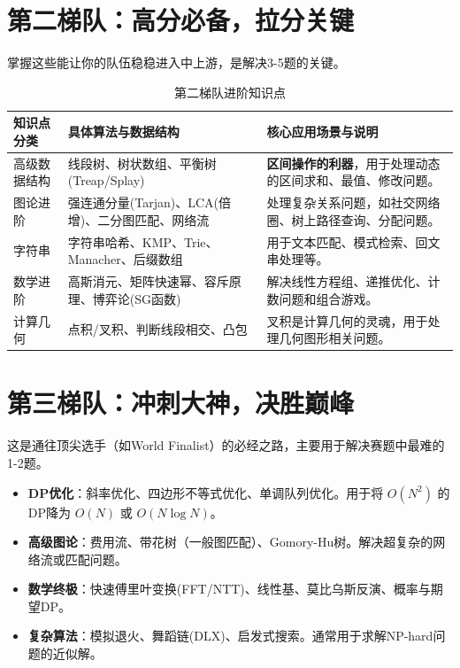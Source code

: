 \documentclass[12pt,a4paper]{ctexart}
\begin{document}
	\section{第二梯队：高分必备，拉分关键}
	掌握这些能让你的队伍稳稳进入中上游，是解决3-5题的关键。
	
	\begin{table}[h!]
		\centering
		\caption{第二梯队进阶知识点}
		\label{tab:tier2}
		\begin{tabularx}{\textwidth}{|X|X|X|}
			\hline
			\rowcolor{lightgray} \textbf{知识点分类} & \textbf{具体算法与数据结构} & \textbf{核心应用场景与说明} \\ \hline
			高级数据结构 & 线段树、树状数组、平衡树(Treap/Splay) & \textbf{区间操作的利器}，用于处理动态的区间求和、最值、修改问题。 \\ \hline
			图论进阶 & 强连通分量(Tarjan)、LCA(倍增)、二分图匹配、网络流 & 处理复杂关系问题，如社交网络圈、树上路径查询、分配问题。 \\ \hline
			字符串 & 字符串哈希、KMP、Trie、Manacher、后缀数组 & 用于文本匹配、模式检索、回文串处理等。 \\ \hline
			数学进阶 & 高斯消元、矩阵快速幂、容斥原理、博弈论(SG函数) & 解决线性方程组、递推优化、计数问题和组合游戏。 \\ \hline
			计算几何 & 点积/叉积、判断线段相交、凸包 & 叉积是计算几何的灵魂，用于处理几何图形相关问题。 \\ \hline
		\end{tabularx}
	\end{table}
	
	\section{第三梯队：冲刺大神，决胜巅峰}
	这是通往顶尖选手（如World Finalist）的必经之路，主要用于解决赛题中最难的1-2题。
	
	\begin{itemize}
		\item \textbf{DP优化}：斜率优化、四边形不等式优化、单调队列优化。用于将 \(O(N^2)\) 的DP降为 \(O(N)\) 或 \(O(N \log N)\)。
		\item \textbf{高级图论}：费用流、带花树（一般图匹配）、Gomory-Hu树。解决超复杂的网络流或匹配问题。
		\item \textbf{数学终极}：快速傅里叶变换(FFT/NTT)、线性基、莫比乌斯反演、概率与期望DP。
		\item \textbf{复杂算法}：模拟退火、舞蹈链(DLX)、启发式搜索。通常用于求解NP-hard问题的近似解。
	\end{itemize}
	
\end{document}
